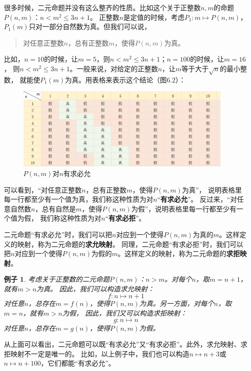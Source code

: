 \documentclass[12pt,UTF8]{ctexbook}
\newtheorem*{ex*}{例子}
\begin{document}
很多时候，二元命题并没有这么整齐的性质。比如这个关于正整数$n,m$的命题$P(n,m)$：$n < m^2 \leqslant 3n+1$。
正整数$n$是定值的时候，考虑$P_1: m \mapsto P(n,m)$，$P_1(m)$只对一部分自然数为真。但我们可以说，
\begin{quotation}
    对任意正整数$n$，总有正整数$m$，使得$P(n,m)$为真。
\end{quotation}
比如，$n=10$的时候，让$m = 5$，则$n < m^2 \leqslant 3n+1$；$n=100$的时候，让$m = 16$，
则$n < m^2 \leqslant 3n+1$。一般来说，对给定的正整数$n$，让$m$等于大于$\sqrt{n}$的最小整数，
就能使$P_1(m)$为真。用表格来表示这个结论（图$6.2$）：
\begin{figure}[H] %
    \vspace{4pt}
    \centering
    \includegraphics[width=0.96\textwidth]{多元映射12.png}
    \caption{$P(n,m)$对$n$有求必允}
\end{figure}

可以看到，“对任意正整数$n$，总有正整数$m$，使得$P(n,m)$为真”，
说明表格里每一行都至少有一个值为真，我们称这种性质为对$n$“\textbf{有求必允}”。
反过来，“对任意自然数$n$，总有自然是$m$，使得$P(n,m)$为假”，说明表格里每一行都至少有一个值为假，
我们称这种性质为对$n$“\textbf{有求必拒}”。

二元命题“有求必允”时，我们可以把$n$对应到一个使得$P(n,m)$为真的$m$。这样定义的映射，称为二元命题的\textbf{求允映射}。
同理，二元命题“有求必拒”时，我们可以把$n$对应到一个使得$P(n,m)$为假的$m$。这样定义的映射，称为二元命题的\textbf{求拒映射}。

\begin{ex*}
    考虑关于正整数的二元命题$P(n,m)$：$n > m$。对每个$n$，取$m = n + 1$，就有$m > n$为真。
    因此，我们可以构造求允映射：
$$f: n \mapsto n + 1$$
对任意$n$，总存在$m = f(n)$，使得$P(n,m)$为真。另一方面，对每个$n$，取$m = n$，就有$m > n$为假，
因此，我们又可以构造求拒映射：
$$g: n \mapsto n $$
对任意$n$，总存在$m = g(n)$，使得$P(n,m)$为假。
\end{ex*}

从上面可以看出，二元命题可以既“有求必允”又“有求必拒”。此外，求允映射、求拒映射不一定是唯一的。
比如，以上例子中，我们也可以构造$n \mapsto n + 3$或$n \mapsto n + 100$，它们都能“有求必允”。
\end{document}
